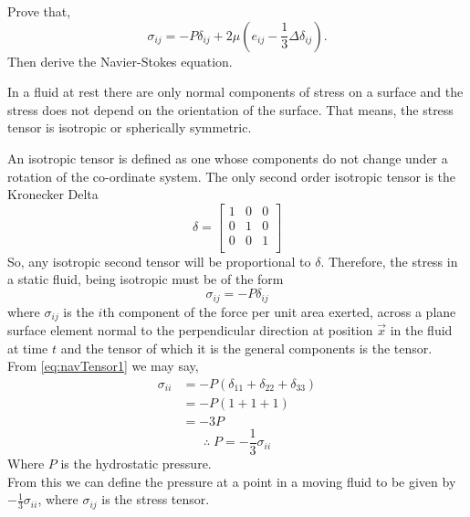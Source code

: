 \documentclass[../main-sheet.tex]{subfiles}
\begin{document}
\begin{prob}
    Prove that,
    \[\sigma_{ij}=-P\delta_{ij}+2\mu(e_{ij}-\frac{1}{3}\Delta \delta_{ij}).\]
    Then derive the Navier-Stokes equation.
\end{prob}
\begin{soln}
    In a fluid at rest there are only normal components of stress on a surface and the stress does not depend on the orientation of the surface. That means, the stress tensor is isotropic or spherically symmetric.

    An isotropic tensor is defined as one whose components do not change under a rotation of the co-ordinate system. The only second order isotropic tensor is the Kronecker Delta
    \[\delta=\begin{bmatrix}
        1&0&0\\
        0&1&0\\
        0&0&1\\
    \end{bmatrix}\]
    So, any isotropic second tensor will be proportional to \(\delta\). Therefore, the stress in a static fluid, being isotropic must be of the form
    \begin{equation}
        \sigma_{ij}=-P\delta_{ij}\label{eq:navTensor1}
    \end{equation}
    where \(\sigma_{ij}\) is the \(i\)th component of the force per unit area exerted, across a plane surface element normal to the perpendicular direction at position \(\vec{x}\) in the fluid at time \(t\) and the tensor of which it is the general components is the tensor.\\
    From \eqref{eq:navTensor1} we may say,
    \begin{align*}
        \sigma_{ii}&=-P (\delta_{11}+\delta_{22}+\delta_{33})\\
        &=-P (1+1+1)\\
        &=-3P
    \end{align*}
    \begin{equation}
        \therefore \; P=-\frac{1}{3}\sigma_{ii} \label{eq:navTensor2}
    \end{equation}
    Where \(P\) is the hydrostatic pressure.\\
    From this we can define the pressure at a point in a moving fluid to be given by \(-\frac{1}{3}\sigma_{ii}\), where \(\sigma_{ij}   \) is the stress tensor.


\end{soln}
\end{document}
